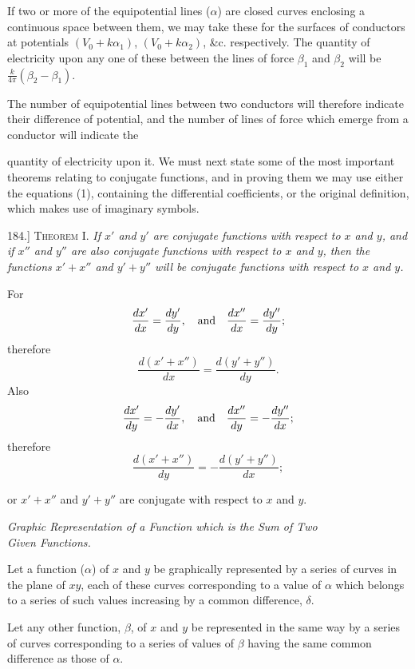 \documentclass[11pt,a4paper]{article}
\begin{document}
If two or more of the equipotential lines ($\alpha$) are closed curves enclosing a continuous space between them, we may take these for the surfaces of conductors at potentials $(V_0+k\alpha_1)$, $(V_0+k\alpha_2)$, \&c. respectively. The quantity of electricity upon any one of these between the lines of force $\beta_1$ and $\beta_2$ will be $\frac{k}{4\pi}(\beta_2-\beta_1)$.

The number of equipotential lines between two conductors will therefore indicate their difference of potential, and the number of lines of force which emerge from a conductor will indicate the

quantity of electricity upon it. We must next state some of the most important theorems relating to conjugate functions, and in proving them we may use either the equations (1), containing the differential coefficients, or the original definition, which makes use of imaginary symbols.

184.] \textsc{Theorem I.} \textit{If $x'$ and $y'$ are conjugate functions with respect to $x$ and $y$, and if $x''$ and $y''$ are also conjugate functions with respect to $x$ and $y$, then the functions $x'+x''$ and $y'+y''$ will be conjugate functions with respect to $x$ and $y$.}

For
\[
\frac{dx'}{dx}=\frac{dy'}{dy},
\quad \hbox{and}\quad
\frac{dx''}{dx}=\frac{dy''}{dy};
\]
therefore
\[
\frac{d(x'+x'')}{dx}=\frac{d(y'+y'')}{dy}.
\]
Also
\[
\frac{dx'}{dy}=-\frac{dy'}{dx},
\quad \hbox{and}\quad
\frac{dx''}{dy}=-\frac{dy''}{dx};
\]
therefore
\[
\frac{d(x'+x'')}{dy}=-\frac{d(y'+y'')}{dx};
\]

or $x'+x''$ and $y'+y''$ are conjugate with respect to $x$ and $y$.

\setcounter{footnote}{0}
\begin{center}
\textit{Graphic Representation of a Function which is the Sum of Two}\\
\textit{Given Functions.}
\end{center}

Let a function ($\alpha$) of $x$ and $y$ be graphically represented by a series of curves in the plane of $xy$, each of these curves corresponding to a value of $\alpha$ which belongs to a series of such values increasing by a common difference, $\delta$.

Let any other function, $\beta$, of $x$ and $y$ be represented in the same way by a series of curves corresponding to a series of values of $\beta$ having the same common difference as those of $\alpha$.
\end{document}
